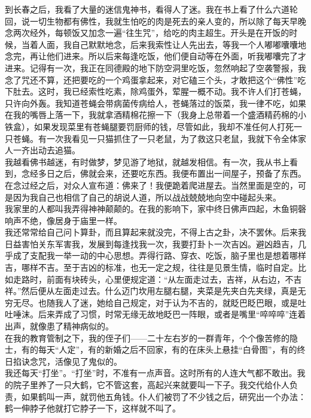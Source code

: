 到长春之后，我看了大量的迷信鬼神书，看得人了迷。我在书上看了什么六道轮回，说一切生物都有佛性，我就生怕吃的肉是死去的亲人变的，所以除了每天早晚念两次经外，每顿饭又加念一遍“往生咒”，给吃的肉主超生。开头是在开饭的时候，当着人面，我自己默默地念，后来我索性让人先出去，等我一个人嘟嘟囔囔地念完，再让他们进来。所以后来每逢吃饭，他们便自动等在外面，听我嘟囔完了才进来。记得有一次，我正在同德殿的地下防空洞里吃饭，忽然响起了空袭警报，我念了咒还不算，还把要吃的一个鸡蛋拿起来，对它磕三个头，才敢把这个“佛性”吃下肚去。这时，我已经索性吃素，除鸡蛋外，荤腥一概不动。我不许人们打苍蝇，只许向外轰。我知道苍蝇会带病菌传病给人，苍蝇落过的饭菜，我一律不吃，如果在我的嘴唇上落一下，我就拿酒精棉花擦一下（我身上总带着一个盛酒精药棉的小铁盒），如果发现菜里有苍蝇腿要罚厨师的钱，尽管如此，我却不准任何人打死一只苍蝇。有一次我看见一只猫抓住了一只老鼠，为了救这只老鼠，我就下令全体家人一齐出动去追猫。\\

我越看佛书越迷，有时做梦，梦见游了地狱，就越发相信。有一次，我从书上看到，念经多日之后，佛就会来，还要吃东西。我便布置出一间屋子，预备了东西。在念过经之后，对众人宣布道：佛来了！我便跪着爬进屋去。当然里面是空的，可是因为我自己也相信了自己的胡说人道，所以战战兢兢地向空中碰起头来。\\

我家里的人都叫我弄得神神颠颠的。在我的影响下，家中终日佛声四起，木鱼铜磬响声不绝，像居身于庙里一样。\\

我还常常给自己问卜算卦，而且算起来就没完，不得上古之卦，决不罢休。后来我日益害怕关东军害我，发展到每逢找我一次，我要打卦卜一次吉凶。避凶趋吉，几乎成了支配我一举一动的中心思想。弄得行路、穿衣、吃饭，脑子里也是想着哪样吉，哪样不吉。至于吉凶的标准，也无一定之规，往往是见景生情，临时自定。比如走路时，前面有块砖头，心里便规定道：“从左面走过去，吉祥，从右边，不吉祥。”然后便从左面走过去。什么迈门坎用左腿右腿，夹菜是先夹白先夹绿，真是无穷无尽。也随我人了迷，她给自己规定，对于认为不吉的，就眨巴眨巴眼，或是吐吐唾沫。后来弄成了习惯，时常无缘无故地眨巴一阵眼，或者是嘴里“啐啐啐”连着出声，就像患了精神病似的。\\

在我的教育管制之下，我的侄子们——二十左右岁的一群青年，个个像苦修的隐士，有的每天“人定”，有的新婚之后不回家，有的在床头上悬挂“白骨图”，有的终日掐诀念咒，活像见了鬼似的。\\

我还每天“打坐”。“打坐”时，不准有一点声音。这时所有的人连大气都不敢出。我的院子里养了一只大鹤，它不管这套，高起兴来就要叫一下子。我交代给仆人负责，如果鹤叫一声，就罚他五角钱。仆人们被罚了不少钱之后，研究出一个办法：鹤一伸脖子他就打它脖子一下，这样就不叫了。\\

